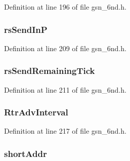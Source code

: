 Definition at line 196 of file gsn\_\-6nd.h.

\hypertarget{a00194_acfd2bce448b81f1d1ac43333c004816e}{
\subsubsection[{rsSendInP}]{ {\bf rsSendInP}}}
\label{a00194_acfd2bce448b81f1d1ac43333c004816e}


Definition at line 209 of file gsn\_\-6nd.h.

\hypertarget{a00194_a1bbfca54866e974d4e89a973b2a13b58}{
\subsubsection[{rsSendRemainingTick}]{ {\bf rsSendRemainingTick}}}
\label{a00194_a1bbfca54866e974d4e89a973b2a13b58}


Definition at line 211 of file gsn\_\-6nd.h.

\hypertarget{a00194_a9fd26f100ab970329ae6eee6a844ffe6}{
\subsubsection[{RtrAdvInterval}]{ {\bf RtrAdvInterval}}}
\label{a00194_a9fd26f100ab970329ae6eee6a844ffe6}


Definition at line 217 of file gsn\_\-6nd.h.

\hypertarget{a00194_a9b19e8e3387061f7498579b37cdbabdf}{
\subsubsection[{shortAddr}]{ {\bf shortAddr}}}
\label{a00194_a9b19e8e3387061f7498579b37cdbabdf}


